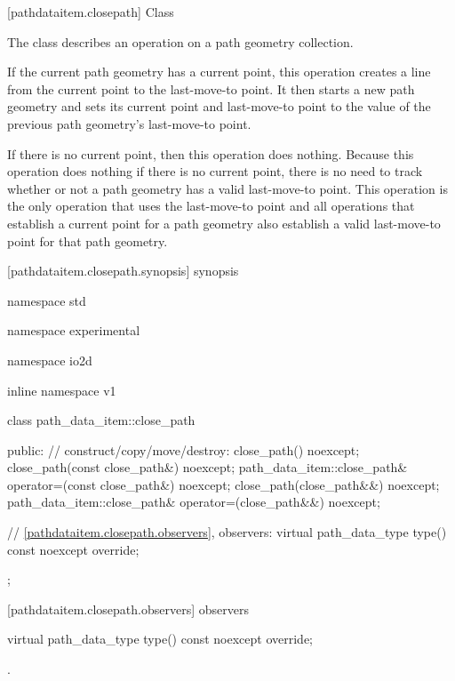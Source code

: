  [pathdataitem.closepath] {Class }

\pnum
{}
The class  describes an operation on a path geometry collection.

\pnum
If the current path geometry has a current point, this operation creates a line from the current point to the last-move-to point. It then starts a new path geometry and sets its current point and last-move-to point to the value of the previous path geometry's last-move-to point.

\pnum
If there is no current point, then this operation does nothing.
\enternote
Because this operation does nothing if there is no current point, there is no need to track whether or not a path geometry has a valid last-move-to point. This operation is the only operation that uses the last-move-to point and all operations that establish a current point for a path geometry also establish a valid last-move-to point for that path geometry.
\exitnote

 [pathdataitem.closepath.synopsis] { synopsis}

\begin{codeblock}
namespace std { namespace experimental { namespace io2d { inline namespace v1 {
  class path_data_item::close_path {
  public:
    // construct/copy/move/destroy:
    close_path() noexcept;
    close_path(const close_path&) noexcept;
    path_data_item::close_path& operator=(const close_path&) noexcept;
    close_path(close_path&&) noexcept;
    path_data_item::close_path& operator=(close_path&&) noexcept;

    // \ref{pathdataitem.closepath.observers}, observers:
    virtual path_data_type type() const noexcept override;
  };
} } } }
\end{codeblock}

 [pathdataitem.closepath.observers]{ observers}

\begin{itemdecl}
    virtual path_data_type type() const noexcept override;
\end{itemdecl}
\begin{itemdescr}
	\pnum
	\returns
	.
\end{itemdescr}
